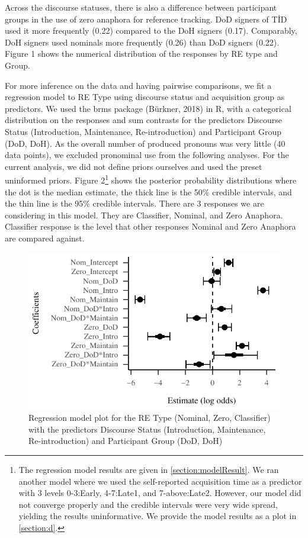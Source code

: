 \documentclass[]{elsarticle} %
\begin{document}
Across the discourse statuses, there is also a difference between
participant groups in the use of zero anaphora for reference tracking.
DoD signers of TİD used it more frequently (0.22) compared to the DoH
signers (0.17). Comparably, DoH signers used nominals more frequently
(0.26) than DoD signers (0.22). Figure 1 shows the numerical
distribution of the responses by RE type and Group.

For more inference on the data and having pairwise comparisons, we fit a
regression model to RE Type using discourse status and acquisition group
as predictors. We used the brms package (Bürkner, 2018) in R, with a
categorical distribution on the responses and sum contrasts for the
predictors Discourse Status (Introduction, Maintenance, Re-introduction)
and Participant Group (DoD, DoH). As the overall number of produced
pronouns was very little (40 data points), we excluded pronominal use
from the following analyses. For the current analysis, we did not define
priors ourselves and used the preset uninformed priors. Figure
2\footnote{The regression model results are given in
  \ref{section:modelResult}. We ran another model where we used the
  self-reported acquisition time as a predictor with 3 levels 0-3:Early,
  4-7:Late1, and 7-above:Late2. However, our model did not converge
  properly and the credible intervals were very wide spread, yielding
  the results uninformative. We provide the model results as a plot in
  \ref{section:d}.} shows the posterior probability distributions where
the dot is the median estimate, the thick line is the 50\% credible
intervals, and the thin line is the 95\% credible intervals. There are 3
responses we are considering in this model. They are Classifier,
Nominal, and Zero Anaphora. Classifier response is the level that other
responses Nominal and Zero Anaphora are compared against.

\begin{figure}
\centering
\includegraphics{revised_manuscript_files/figure-latex/model-gram-1.pdf}
\caption{Regression model plot for the RE Type (Nominal, Zero,
Classifier) with the predictors Discourse Status (Introduction,
Maintenance, Re-introduction) and Participant Group (DoD, DoH)}
\end{figure}
\end{document}
